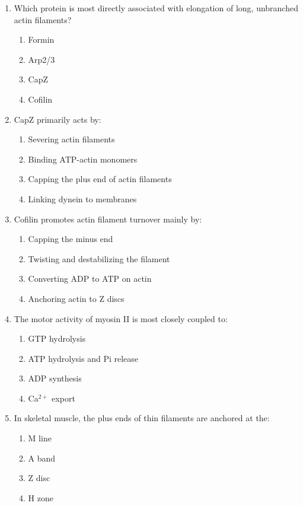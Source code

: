 \documentclass[12pt,fontset=none]{ctexart}
\begin{document}
\begin{enumerate}
\item Which protein is most directly associated with elongation of long, unbranched actin filaments?
\begin{enumerate}[label=\alph*.]
\item Formin
\item Arp2/3
\item CapZ
\item Cofilin
\end{enumerate}

\item CapZ primarily acts by:
\begin{enumerate}[label=\alph*.]
\item Severing actin filaments
\item Binding ATP-actin monomers
\item Capping the plus end of actin filaments
\item Linking dynein to membranes
\end{enumerate}

\item Cofilin promotes actin filament turnover mainly by:
\begin{enumerate}[label=\alph*.]
\item Capping the minus end
\item Twisting and destabilizing the filament
\item Converting ADP to ATP on actin
\item Anchoring actin to Z discs
\end{enumerate}

\item The motor activity of myosin II is most closely coupled to:
\begin{enumerate}[label=\alph*.]
\item GTP hydrolysis
\item ATP hydrolysis and Pi release
\item ADP synthesis
\item Ca$^{2+}$ export
\end{enumerate}

\item In skeletal muscle, the plus ends of thin filaments are anchored at the:
\begin{enumerate}[label=\alph*.]
\item M line
\item A band
\item Z disc
\item H zone
\end{enumerate}


\end{enumerate}
\end{document}

